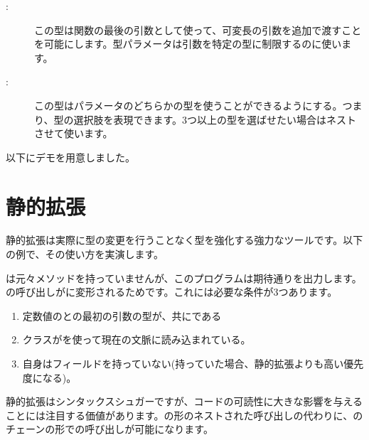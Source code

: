 \begin{description}
	\item[:] この型は関数の最後の引数として使って、可変長の引数を追加で渡すことを可能にします。型パラメータは引数を特定の型に制限するのに使います。
	\item[:] この型はパラメータのどちらかの型を使うことができるようにする。つまり、型の選択肢を表現できます。3つ以上の型を選ばせたい場合はネストさせて使います。
\end{description}

以下にデモを用意しました。



\section{静的拡張}
\label{lf-static-extension}


静的拡張は実際に型の変更を行うことなく型を強化する強力なツールです。以下の例で、その使い方を実演します。


は元々メソッドを持っていませんが、このプログラムは期待通りを出力します。の呼び出しがに変形されるためです。これには必要な条件が3つあります。

\begin{enumerate}
	\item 定数値のとの最初の引数の型が、共にである
	\item {}クラスがを使って現在の文脈に読み込まれている。
	\item {}自身はフィールドを持っていない(持っていた場合、静的拡張よりも高い優先度になる)。
\end{enumerate}

静的拡張はシンタックスシュガーですが、コードの可読性に大きな影響を与えることには注目する価値があります。の形のネストされた呼び出しの代わりに、のチェーンの形での呼び出しが可能になります。

